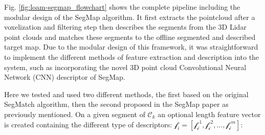 \documentclass[letterpaper, 10 pt, conference]{ieeeconf}  %
\begin{document}
Fig. \ref{fig:loam-segmap_flowchart} shows the complete pipeline including the modular design of the SegMap algorithm. It first extracts the pointcloud after a voxelization and filtering step then describes the segments from the 3D Lidar point clouds and matches these segments to the offline segmented and described target map. Due to the modular design of this framework, it was straightforward to implement the different methods of feature extraction and description into the system, such as incorporating the novel 3D point cloud Convolutional Neural Network (CNN) descriptor of SegMap.


Here we tested and used two different methods, the first based on the original SegMatch algorithm, then the second proposed in the SegMap paper as previously mentioned. 
On a given segment of $\mathcal{C}_k$ an optional length feature vector is created containing the different type of descriptors: $\mathscr{f}_i=[\mathscr{f_i}^1, \mathscr{f_i}^2, \dots, \mathscr{f_i}^m]$:
\end{document}
